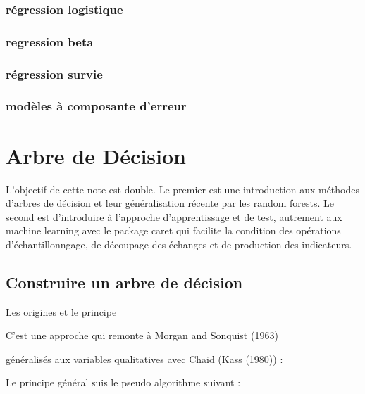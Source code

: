 \documentclass[
]{book}
\begin{document}
\hypertarget{ruxe9gression-logistique}{%
\subsection{régression logistique}\label{ruxe9gression-logistique}}

\hypertarget{regression-beta}{%
\subsection{regression beta}\label{regression-beta}}

\hypertarget{ruxe9gression-survie}{%
\subsection{régression survie}\label{ruxe9gression-survie}}

\hypertarget{moduxe8les-uxe0-composante-derreur}{%
\subsection{modèles à composante d'erreur}\label{moduxe8les-uxe0-composante-derreur}}

\hypertarget{arbre-de-duxe9cision}{%
\chapter{Arbre de Décision}\label{arbre-de-duxe9cision}}

L'objectif de cette note est double. Le premier est une introduction aux méthodes d'arbres de décision et leur généralisation récente par les random forests. Le second est d'introduire à l'approche d'apprentissage et de test, autrement aux machine learning avec le package caret qui facilite la condition des opérations d'échantillonngage, de découpage des échanges et de production des indicateurs.

\hypertarget{construire-un-arbre-de-duxe9cision}{%
\section{Construire un arbre de décision}\label{construire-un-arbre-de-duxe9cision}}

Les origines et le principe

C'est une approche qui remonte à Morgan and Sonquist (1963)

généralisés aux variables qualitatives avec Chaid (Kass (1980)) :

Le principe général suis le pseudo algorithme suivant :
\end{document}
